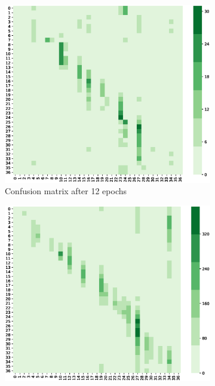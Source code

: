 \begin{figure}
    \centering
    \begin{subfigure}[t]{0.49\textwidth} %
        \includegraphics[width=\textwidth]{Figures/confusion-matrix/ckpt-10342.eps}
        \caption{Confusion matrix after 12 epochs}
        \label{fig:imga}
    \end{subfigure}
    \begin{subfigure}[t]{0.49\textwidth} 
         \includegraphics[width=\textwidth]{Figures/confusion-matrix/ckpt-20622.eps}

\end{subfigure}
\end{figure}
